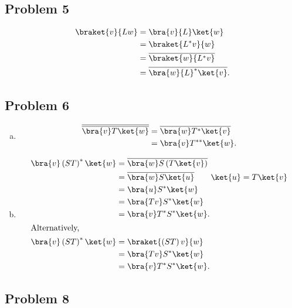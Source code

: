 \documentclass[10pt]{mypackage}
\begin{document}
\subsection{Problem 5}%
\begin{align*}
  \braket{v}{{L}w} &= \bra{v}{L}\ket{w}\\
                           &= \braket{{L}^{\ast}v}{w}\\
                           &= \overline{\braket{w}{{L}^{\ast}v}}\\
                           &= \overline{\bra{w}{L}^{\ast}\ket{v}}.
\end{align*}
\subsection{Problem 6}%
\begin{enumerate}[(a)]
  \item 
      \begin{align*}
        \overline{\overline{\bra{v}T\ket{w}}} &= \overline{\bra{w}T^{\ast}\ket{v}}\\
                                              &= \bra{v}T^{\ast\ast}\ket{w}.
      \end{align*}
  \item 
    \begin{align*}
      \bra{v}\left(ST\right)^{\ast}\ket{w} &= \overline{\bra{w}S\left(T\ket{v}\right)}\\
                                           &= \overline{\bra{w}S\ket{u}}\tag*{$\ket{u} = T\ket{v}$}\\
                                           &= \bra{u}S^{\ast}\ket{w}\\
                                           &= \bra{Tv}S^{\ast}\ket{w}\\
                                           &= \bra{v}T^{\ast}S^{\ast}\ket{w}.\\
                                           \intertext{Alternatively,}
      \bra{v}\left(ST\right)^{\ast}\ket{w} &= \braket{\left(ST\right)v}{w}\\
                                           &= \bra{Tv}S^{\ast}\ket{w}\\
                                           &= \bra{v}T^{\ast}S^{\ast}\ket{w}.
    \end{align*}
\end{enumerate}
\subsection{Problem 8}%
\end{document}
